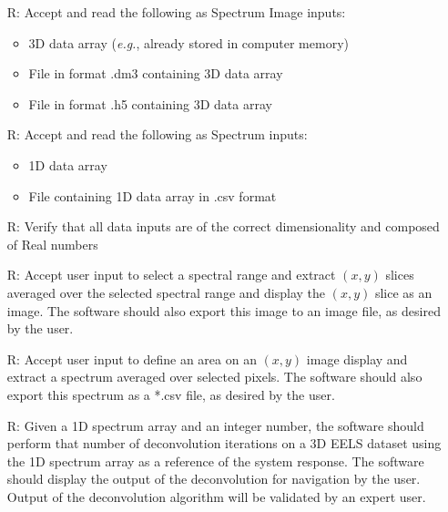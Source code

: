 \documentclass[12pt]{article}
\newcounter{reqnum} %
\begin{document}
\noindent \begin{itemize}

	\item[R\refstepcounter{reqnum}\thereqnum \label{R_SI_inputs}:] Accept and read
the following as Spectrum Image inputs:
	
	\begin{itemize}
		\item 3D data array (\textit{e.g.}, already stored in computer memory)
		\item File in format .dm3 containing 3D data array
		\item File in format .h5 containing 3D data array
	\end{itemize}
	
	\item[R\refstepcounter{reqnum}\thereqnum \label{R_spectrum_inputs}:] Accept and
read the following as Spectrum inputs:
	
	\begin{itemize}
		\item 1D data array
		\item File containing 1D data array in .csv format
	\end{itemize}

	\item[R\refstepcounter{reqnum}\thereqnum \label{R_Input_dimension}:] Verify
that all data inputs are of the correct dimensionality and composed of Real
numbers
	
	\item[R\refstepcounter{reqnum}\thereqnum \label{R_SI_slicing}:] Accept user
input to select a spectral range and extract $(x,y)$ slices averaged over the
selected spectral range and display the $(x,y)$ slice as an image. The software
should also export this image to an image file, as desired by the user.
	
	\item[R\refstepcounter{reqnum}\thereqnum \label{R_SI_area}:] Accept user input
to define an area on an $(x,y)$ image display and extract a spectrum averaged
over selected pixels. The software should also export this spectrum as a *.csv
file, as desired by the user.
	
	\item[R\refstepcounter{reqnum}\thereqnum \label{R_deconvolution}:] Given a 1D
spectrum array and an integer number, the software should perform that number of
deconvolution iterations on a 3D EELS dataset using the 1D spectrum array as a
reference of the system response. The software should display the output of the
deconvolution for navigation by the user. Output of the deconvolution algorithm
will be validated by an expert user. 
	

\end{itemize}
\end{document}
